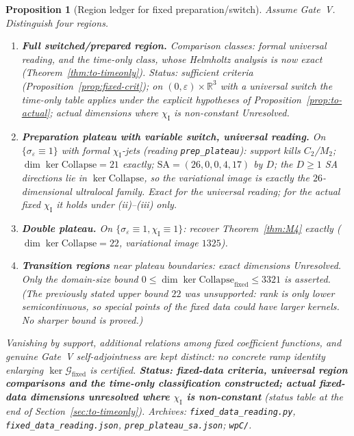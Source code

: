 \documentclass{article}
\newtheorem{proposition}{Proposition}
\theoremstyle{remark}
\newcommand{\sigeps}{\sigma_\varepsilon}
\newcommand{\chiI}{\chi_{\mathrm I}}
\newcommand{\Coll}{\mathrm{Collapse}}
\begin{document}
\begin{proposition}[Region ledger for fixed preparation/switch]
\label{prop:fixed-regions}
Assume Gate~V. Distinguish four regions.
\begin{enumerate}
\item \textbf{Full switched/prepared region.} Comparison classes: formal universal reading, and the time-only class, whose Helmholtz analysis is now exact (Theorem~\ref{thm:to-timeonly}). Status: sufficient criteria (Proposition~\ref{prop:fixed-crit}); on $(0,\varepsilon)\times\mathbb R^3$ with a universal switch the time-only table applies under the explicit hypotheses of Proposition~\ref{prop:to-actual}; actual dimensions where $\chiI$ is non-constant Unresolved.
\item \textbf{Preparation plateau with variable switch, universal reading.} On $\{\sigeps\equiv1\}$ with formal $\chiI$-jets (reading \texttt{prep\_plateau}): support kills $C_2$/$M_2$; $\dim\ker\Coll=21$ exactly; $\mathrm{SA}=(26,0,0,4,17)$ by $D$; the $D\ge1$ SA directions lie in $\ker\Coll$, so the variational image is exactly the $26$-dimensional ultralocal family. Exact for the universal reading; for the actual fixed $\chiI$ it holds under (ii)--(iii) only.
\item \textbf{Double plateau.} On $\{\sigeps\equiv1,\chiI\equiv1\}$: recover Theorem~\ref{thm:M4} exactly ($\dim\ker\Coll=22$, variational image $1325$).
\item \textbf{Transition regions} near plateau boundaries: exact dimensions Unresolved. Only the domain-size bound $0\le\dim\ker\Coll_{\mathrm{fixed}}\le3321$ is asserted. (The previously stated upper bound $22$ was unsupported: rank is only lower semicontinuous, so special points of the fixed data could have larger kernels. No sharper bound is proved.)
\end{enumerate}
Vanishing by support, additional relations among fixed coefficient functions, and genuine Gate~V self-adjointness are kept distinct: no concrete ramp identity enlarging $\ker\mathcal G_{\mathrm{fixed}}$ is certified.
\textbf{Status: fixed-data criteria, universal region comparisons and the time-only classification constructed; actual fixed-data dimensions unresolved where $\chiI$ is non-constant} (status table at the end of Section~\ref{sec:to-timeonly}).
Archives: \texttt{fixed\_data\_reading.py}, \texttt{fixed\_data\_reading.json}, \texttt{prep\_plateau\_sa.json}; \texttt{wpC/}.
\end{proposition}

\end{document}
